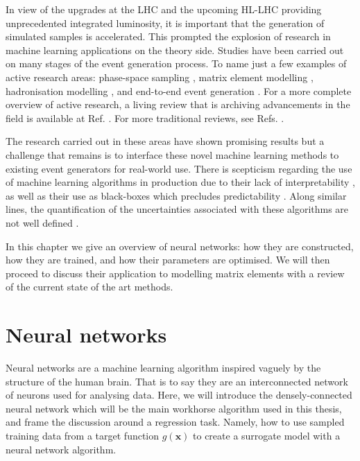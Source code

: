 \documentclass[main.tex]{subfiles}
\begin{document}
    In view of the upgrades at the LHC and the upcoming
    HL-LHC providing unprecedented integrated luminosity,
    it is important that the generation of simulated samples
    is accelerated. This prompted the explosion of research
    in machine learning applications on the theory side.
    Studies have been carried out on many stages of the event
    generation process.
    To name just a few examples of active research areas:
    phase-space sampling \cite{Bendavid:2017zhk,Klimek:2018mza,Bothmann:2020ywa,Verheyen:2020bjw,Gao:2020vdv},
    matrix element modelling \cite{Bishara:2019iwh,Badger:2020uow,Aylett-Bullock:2021hmo,Maitre:2021uaa,Badger:2022hwf},
    hadronisation modelling \cite{Biro:2021zgm,Ilten:2022jfm,Ghosh:2022zdz},
    and end-to-end event generation \cite{Gao:2020zvv,DiSipio:2019imz,Butter:2019cae,Butter:2021csz,ArjonaMartinez:2019ahl}.
    For a more complete overview of active research,
    a living review that is archiving advancements in the
    field is available at Ref. \cite{Feickert:2021ajf}.
    For more traditional reviews, see Refs.
    \cite{Guest:2018yhq,Radovic:2018dip,Butter:2022rso}.

    The research carried out in these areas have shown
    promising results but a challenge that remains
    is to interface these novel machine learning methods
    to existing event generators for real-world use.
    There is scepticism regarding the use of machine learning
    algorithms in production due to their lack of interpretability \cite{Grojean:2022mef},
    as well as their use as black-boxes which precludes predictability \cite{Schwartz:2022njo}.
    Along similar lines, the quantification of the uncertainties
    associated with these algorithms are not well defined \cite{Chen:2022pzc}.

    In this chapter we give an overview of neural
    networks: how they are constructed, how
    they are trained, and how their parameters are optimised.
    We will then proceed to discuss their
    application to modelling matrix
    elements with a review of the current
    state of the art methods.

\section{Neural networks}
    Neural networks are a machine learning algorithm
    inspired vaguely by the structure of the human brain.
    That is to say they are an interconnected network
    of neurons used for analysing data. Here, we will
    introduce the densely-connected neural network
    which will be the main workhorse algorithm used
    in this thesis, and frame the discussion around a
    regression task. Namely, how to use sampled training data
    from a target function $g(\mathbf{x})$ to create a surrogate
    model with a neural network algorithm.
\end{document}
